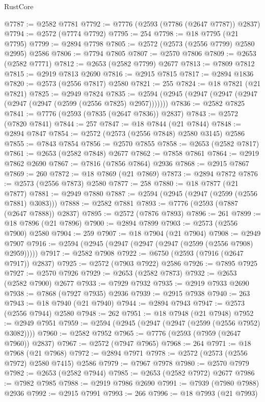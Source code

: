 \begin{lexlean}{RustCore}
\begin{coremodule}
@7787 := @2582 @7781
@7792 := @7776 (@2593 (@7786 (@2647 @7787)) @2837)
@7794 := @2572 (@7774 @7792)
@7795 := 254
@7798 := @18 @7795 (@21 @7795)
@7799 := @2894 @7798
@7805 := @2572 (@2573 (@2556 @7799) @2580 @2995) @2586
@7806 := @7794 @7805
@7807 := @2570 @7806
@7809 := @2653 (@2582 @7771)
@7812 := @2653 (@2582 @7799) @2677
@7813 := @7809 @7812
@7815 := @2919 @7813 @2690
@7816 := @2915 @7815
@7817 := @2894 @1836
@7820 := @2573 (@2556 @7817) @2580
@7821 := 255
@7824 := @18 @7821 (@21 @7821)
@7825 := @2949 @7824
@7835 := @2594 (@2945 (@2947 (@2947 (@2947 (@2947 (@2947 (@2599 (@2556 @7825) @2957)))))))
@7836 := @2582 @7825
@7841 := @7776 (@2593 (@7835 (@2647 @7836)) @2837)
@7843 := @2572 (@7820 @7841)
@7844 := 257
@7847 := @18 @7844 (@21 @7844)
@7848 := @2894 @7847
@7854 := @2572 (@2573 (@2556 @7848) @2580 @3145) @2586
@7855 := @7843 @7854
@7856 := @2570 @7855
@7858 := @2653 (@2582 @7817)
@7861 := @2653 (@2582 @7848) @2677
@7862 := @7858 @7861
@7864 := @2919 @7862 @2690
@7867 := @7816 (@7856 @7864) @2936
@7868 := @2915 @7867
@7869 := 260
@7872 := @18 @7869 (@21 @7869)
@7873 := @2894 @7872
@7876 := @2573 (@2556 @7873) @2580
@7877 := 258
@7880 := @18 @7877 (@21 @7877)
@7881 := @2949 @7880
@7887 := @2594 (@2945 (@2947 (@2599 (@2556 @7881) @3083)))
@7888 := @2582 @7881
@7893 := @7776 (@2593 (@7887 (@2647 @7888)) @2837)
@7895 := @2572 (@7876 @7893)
@7896 := 261
@7899 := @18 @7896 (@21 @7896)
@7900 := @2894 @7899
@7903 := @2573 (@2556 @7900) @2580
@7904 := 259
@7907 := @18 @7904 (@21 @7904)
@7908 := @2949 @7907
@7916 := @2594 (@2945 (@2947 (@2947 (@2947 (@2599 (@2556 @7908) @2959)))))
@7917 := @2582 @7908
@7922 := @6750 (@2593 (@7916 (@2647 @7917)) @2837)
@7925 := @2572 (@7903 @7922) @2586
@7926 := @7895 @7925
@7927 := @2570 @7926
@7929 := @2653 (@2582 @7873)
@7932 := @2653 (@2582 @7900) @2677
@7933 := @7929 @7932
@7935 := @2919 @7933 @2690
@7938 := @7868 (@7927 @7935) @2936
@7939 := @2915 @7938
@7940 := 263
@7943 := @18 @7940 (@21 @7940)
@7944 := @2894 @7943
@7947 := @2573 (@2556 @7944) @2580
@7948 := 262
@7951 := @18 @7948 (@21 @7948)
@7952 := @2949 @7951
@7959 := @2594 (@2945 (@2947 (@2947 (@2599 (@2556 @7952) @3082))))
@7960 := @2582 @7952
@7965 := @7776 (@2593 (@7959 (@2647 @7960)) @2837)
@7967 := @2572 (@7947 @7965)
@7968 := 264
@7971 := @18 @7968 (@21 @7968)
@7972 := @2894 @7971
@7978 := @2572 (@2573 (@2556 @7972) @2580 @7415) @2586
@7979 := @7967 @7978
@7980 := @2570 @7979
@7982 := @2653 (@2582 @7944)
@7985 := @2653 (@2582 @7972) @2677
@7986 := @7982 @7985
@7988 := @2919 @7986 @2690
@7991 := @7939 (@7980 @7988) @2936
@7992 := @2915 @7991
@7993 := 266
@7996 := @18 @7993 (@21 @7993)

\end{coremodule}
\end{lexlean}
